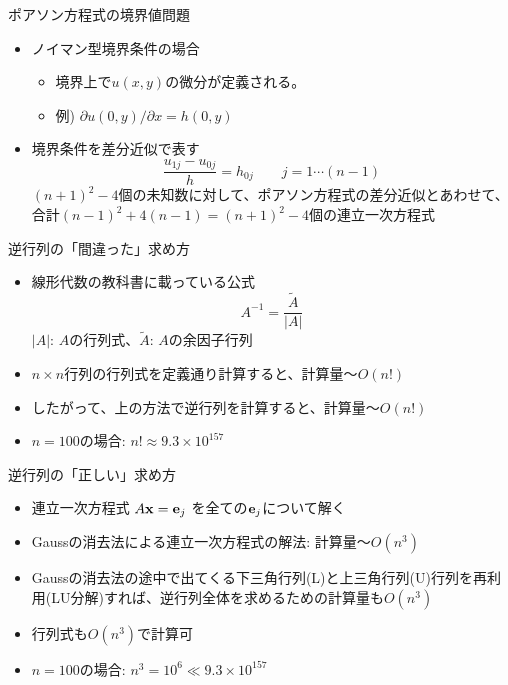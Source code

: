 \documentclass[dvipdfmx]{beamer}
\begin{document}
\begin{frame}[t,fragile]{ポアソン方程式の境界値問題}
  \begin{itemize}
    \setlength{\itemsep}{1em}
  \item ノイマン型境界条件の場合
    \begin{itemize}
    \item 境界上で$u(x,y)$の微分が定義される。
    \item 例) $\partial u(0,y) / \partial x = h(0,y)$
    \end{itemize}
  \item 境界条件を差分近似で表す
    \[
    \frac{u_{1j} - u_{0j}}{h} = h_{0j} \qquad j=1 \cdots (n-1)
    \]
    $(n+1)^2-4$個の未知数に対して、ポアソン方程式の差分近似とあわせて、合計$(n-1)^2+4(n-1)=(n+1)^2-4$個の連立一次方程式
  \end{itemize}
\end{frame}

\begin{frame}[t,fragile]{逆行列の「間違った」求め方}
  \begin{itemize}
    \setlength{\itemsep}{1em}
  \item 線形代数の教科書に載っている公式
    \[
    A^{-1} = \frac{\tilde{A}}{|A|}
    \]
    $|A|$: $A$の行列式、$\tilde{A}$: $A$の余因子行列
  \item $n \times n$行列の行列式を定義通り計算すると、計算量〜$O(n!)$
  \item したがって、上の方法で逆行列を計算すると、計算量〜$O(n!)$
  \item $n=100$の場合: $n! \approx 9.3 \times 10^{157}$
  \end{itemize}
\end{frame}

\begin{frame}[t,fragile]{逆行列の「正しい」求め方}
  \begin{itemize}
    \setlength{\itemsep}{1em}
  \item 連立一次方程式 $A {\bf x} = {\bf e}_j$ を全ての${\bf e}_j$について解く
  \item Gaussの消去法による連立一次方程式の解法: 計算量〜$O(n^3)$
  \item Gaussの消去法の途中で出てくる下三角行列(L)と上三角行列(U)行列を再利用(LU分解)すれば、逆行列全体を求めるための計算量も$O(n^3)$
  \item 行列式も$O(n^3)$で計算可
  \item $n=100$の場合: $n^3 = 10^6 \ll 9.3 \times 10^{157}$
  \end{itemize}
\end{frame}
\end{document}
